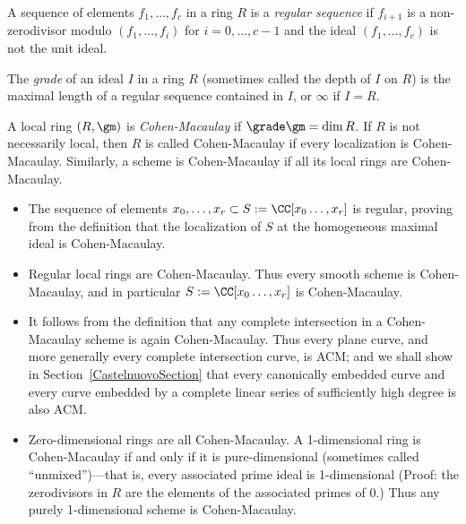 \begin{definition}\label{gradeDef}
A sequence of elements $f_{1}, \dots, f_{c}$ in a ring $R$ is a \emph{regular sequence} if
$f_{i+1}$ is a non-zerodivisor modulo $(f_{1}, \dots, f_{i})$ for $i = 0,\dots, c-1$ and the ideal
$(f_{1}, \dots, f_{c})$ is not the unit ideal. 

The \emph{grade} of an ideal $I$ in a ring  $R$ (sometimes called the depth of $I$ on $R$) is the maximal length of a regular sequence contained in $I$, or $\infty$ if $I = R$. 

A local ring $(R,\gm)$ is \emph{Cohen-Macaulay} if $\grade \gm = \dim R$. If $R$ is not necessarily local, then 
$R$ is called Cohen-Macaulay if every localization is Cohen-Macaulay. Similarly, a scheme is Cohen-Macaulay if
all its local rings are Cohen-Macaulay.
\end{definition}

\begin{example}
\begin{itemize}
 \item The sequence of elements $x_{0},\dots, x_{r}\subset S:= \CC[x_{0}\dots, x_{r}]$ is regular, proving
 from the definition that the localization of $S$ at the homogeneous maximal ideal is Cohen-Macaulay.
 
 \item Regular local rings are Cohen-Macaulay. Thus every smooth scheme is Cohen-Macaulay, and in particular
$S:= \CC[x_{0}\dots, x_{r}]$ is Cohen-Macaulay. 
 
 \item It follows from the definition that any complete intersection in a Cohen-Macaulay scheme is again Cohen-Macaulay.
Thus every plane curve, and more generally every complete intersection curve,
is ACM; and we shall show in Section~\ref{CastelnuovoSection} that every canonically embedded curve
and every curve embedded by a complete linear series of sufficiently high degree is also ACM.

\item Zero-dimensional rings are all Cohen-Macaulay. A 1-dimensional ring is Cohen-Macaulay if and only if
it is pure-dimensional (sometimes called ``unmixed'')---that is, 
every associated prime ideal is 1-dimensional (Proof: the zerodivisors in $R$ are the elements of the associated primes of 0.) Thus any purely 1-dimensional scheme is Cohen-Macaulay. 

\end{itemize}

\end{example}

